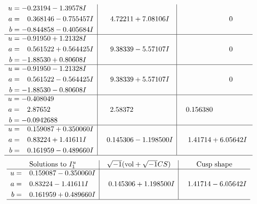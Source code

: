 \documentclass[1p]{elsarticle_modified}
\theoremstyle{definition}
\newcommand{\I}{\sqrt{-1}}
\begin{document}
$$\begin{array}{c|c|c}
\begin{aligned}
u &= -0.23194 - 1.39578 I \\
a &= \phantom{-}0.368146 - 0.755457 I \\
b &= -0.844858 - 0.405684 I\end{aligned}
 & \phantom{-}4.72211 + 7.08106 I & \phantom{-0.000000 } 0 \\ \hline\begin{aligned}
u &= -0.91950 + 1.21328 I \\
a &= \phantom{-}0.561522 + 0.564425 I \\
b &= -1.88530 + 0.80608 I\end{aligned}
 & \phantom{-}9.38339 - 5.57107 I & \phantom{-0.000000 } 0 \\ \hline\begin{aligned}
u &= -0.91950 - 1.21328 I \\
a &= \phantom{-}0.561522 - 0.564425 I \\
b &= -1.88530 - 0.80608 I\end{aligned}
 & \phantom{-}9.38339 + 5.57107 I & \phantom{-0.000000 } 0 \\ \hline\begin{aligned}
u &= -0.408049\phantom{ +0.000000I} \\
a &= \phantom{-}2.87652\phantom{ +0.000000I} \\
b &= -0.0942688\phantom{ +0.000000I}\end{aligned}
 & \phantom{-}2.58372\phantom{ +0.000000I} & \phantom{-}0.156380\phantom{ +0.000000I} \\ \hline\begin{aligned}
u &= \phantom{-}0.159087 + 0.350060 I \\
a &= \phantom{-}0.83224 + 1.41611 I \\
b &= \phantom{-}0.161959 - 0.489660 I\end{aligned}
 & \phantom{-}0.145306 - 1.198500 I & \phantom{-}1.41714 + 6.05642 I\\
 \hline 
 \end{array}$$\newpage$$\begin{array}{c|c|c}  
\text{Solutions to }I^u_{1}& \I (\text{vol} + \sqrt{-1}CS) & \text{Cusp shape}\\
 \hline 
\begin{aligned}
u &= \phantom{-}0.159087 - 0.350060 I \\
a &= \phantom{-}0.83224 - 1.41611 I \\
b &= \phantom{-}0.161959 + 0.489660 I\end{aligned}
 & \phantom{-}0.145306 + 1.198500 I & \phantom{-}1.41714 - 6.05642 I\\
 \hline 
 \end{array}$$\newpage\newpage\renewcommand{\arraystretch}{1}
\end{document}
